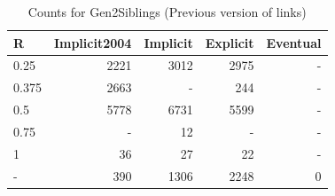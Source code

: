 \documentclass[a4paper]{article}\usepackage{graphicx, color}
\begin{document}
\begin{table}[ht]
\begin{center}
{\large
\begin{tabular}{lrrrr}
  \hline
R & Implicit2004 & Implicit & Explicit & Eventual \\ 
  \hline
0.25 & 2221 & 3012 & 2975 & - \\ 
  0.375 & 2663 & - & 244 & - \\ 
  0.5 & 5778 & 6731 & 5599 & - \\ 
  0.75 & - &  12 & - & - \\ 
  1 &  36 &  27 &  22 & - \\ 
  - & 390 & 1306 & 2248 &   0 \\ 
   \hline
\end{tabular}
}
\caption{Counts for Gen2Siblings (Previous version of links)}
\end{center}
\end{table}


% 
\end{document}
